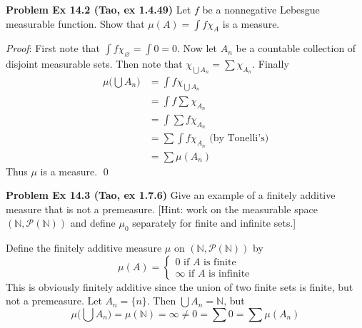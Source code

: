\documentclass[12pt]{article}
\newcommand{\problem}[1]{\hspace{-4 ex} \large \textbf{Problem #1} }
\let\emptyset\varnothing
\newcommand{\powerset}{\mathcal{P}}
\renewenvironment{proof}{\hspace{-4 ex} \emph{Proof}:}{\qed}
\newcommand{\NN}{\mathbb{N}}
\begin{document}
\bigbreak
\problem{Ex 14.2 (Tao, ex 1.4.49)} Let $f$ be a nonnegative Lebesgue measurable function. Show that $\mu(A)=\int f\chi_A$ is a measure. \bigbreak

	\begin{proof}
		First note that $\int f \chi_\emptyset = \int 0 = 0$. Now let $A_n$ be a countable collection of disjoint measurable sets. Then note that $\chi_{\bigcup A_n} = \sum \chi_{A_n}$. Finally
		\begin{align*}
			\mu \Big ( \bigcup A_n \Big ) & = \int f \chi_{\bigcup A_n} \\
			& = \int f \sum \chi_{A_n} \\
			& = \int \sum f \chi_{A_n} \\
			& = \sum \int f \chi_{A_n} \text{\ \ \ (by Tonelli's)} \\
			& = \sum \mu(A_n)
		\end{align*}
		Thus $\mu$ is a measure.
	\end{proof}

\bigbreak
\problem{Ex 14.3 (Tao, ex 1.7.6)} Give an example of a finitely additive measure that is not a premeasure. [Hint: work on the measurable space $(\NN,\mathcal P(\NN))$ and define $\mu_0$ separately for finite and infinite sets.] \bigbreak

	Define the finitely additive measure $\mu$ on $(\NN, \powerset(\NN))$ by
	\[
		\mu(A) = 
			\begin{cases}
				0 \text{ if $A$ is finite}\\
				\infty \text{ if $A$ is infinite}
			\end{cases}
	\]
	This is obviously finitely additive since the union of two finite sets is finite, but not a premeasure. Let $A_n = \{n\}$. Then $\bigcup A_n = \NN$, but 
	$$
	\mu \Big( \bigcup A_n \Big ) = \mu(\NN) = \infty \neq 0 = \sum 0 = \sum \mu(A_n)
	$$
\end{document}
